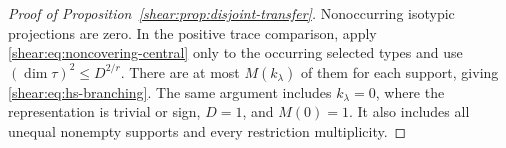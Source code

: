 \begin{proof}[Proof of Proposition~\ref{shear:prop:disjoint-transfer}]
Nonoccurring isotypic projections are zero. In the positive trace
comparison, apply \eqref{shear:eq:noncovering-central} only to the
occurring selected types and use
\((\dim\tau)^2\le D^{2/r}\). There are at most \(M(k_\lambda)\) of
them for each support, giving \eqref{shear:eq:hs-branching}.
The same argument includes \(k_\lambda=0\), where the representation
is trivial or sign, \(D=1\), and \(M(0)=1\). It also includes all
unequal nonempty supports and every restriction multiplicity.
\end{proof}
